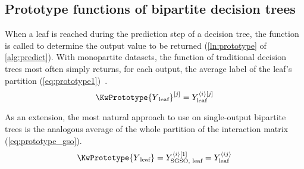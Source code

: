 
%
%
%


\subsection{Prototype functions of bipartite decision trees}

When a leaf is reached during the prediction step of a decision tree, the \KwPrototype function is called to determine the output value to be returned (\autoref{ln:prototype} of \autoref{alg:predict}). With monopartite datasets, the \KwPrototype function of traditional decision trees most often simply returns, for each output, the average label of the leaf's partition (\autoref{eq:prototype1})~\cite{breiman1984classification}.
%
\begin{equation}
    \KwPrototype{Y\textsubscript{leaf}}\el j=Y_\text{leaf}^{\ang{i}[j]}
    \label{eq:prototype1}
\end{equation}

As an extension, the most natural approach to use on single-output bipartite trees is the analogous average of the whole partition of the interaction matrix (\autoref{eq:prototype_gso}).
%
\begin{equation}
    \KwPrototype{Y\textsubscript{leaf}}
        = Y_\text{SGSO, leaf}^{\ang{i}[1]}
        = Y_\text{leaf}^{\ang{ij}}
    \label{eq:prototype_gso}
\end{equation}

